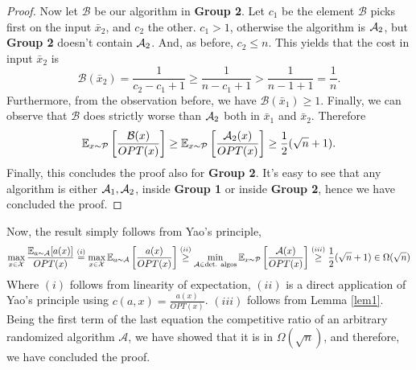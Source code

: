 \documentclass[11pt]{article}
\begin{document}
\begin{enumerate}
\begin{proof}
    Now let $\mathcal {B}$ be our algorithm in \textbf{Group 2}. Let $c_1$ be the element $\mathcal {B}$ picks first on the input $\bar x_2$, and $c_2$ the other. $c_1>1$, otherwise the algorithm is $\mathcal{A}_2$, but \textbf{Group 2} doesn't contain $\mathcal{A}_2$. And, as before, $c_2\leq n$. This yields that the cost in input $\bar x_2$ is 
    \begin{equation*}
        \mathcal {B}(\bar x_2) = \frac{1}{c_2 - c_1 + 1} \geq  \frac{1}{n - c_1 + 1} > \frac{1}{n-1+1} = \frac{1}{n}.
    \end{equation*}
    Furthermore, from the observation before, we have $\mathcal{B}(\bar x_1) \geq 1$. Finally, we can observe that $\mathcal{B}$ does strictly worse than $\mathcal{A}_2$ both in $\bar x_1$ and $\bar x_2$. Therefore
    \begin{equation*}
        \mathbb{E} _{x\sim \mathcal{P}}\left[\frac{\mathcal{B}(x)}{OPT(x)}\right] \geq \mathbb{E} _{x\sim \mathcal{P}}\left[\frac{\mathcal{A}_2(x)}{OPT(x)}\right] \geq \frac{1}{2}(\sqrt{n} + 1).
    \end{equation*}
    Finally, this concludes the proof also for \textbf{Group 2}. It's easy to see that any algorithm is either $\mathcal{A}_1,\mathcal{A}_2$, inside \textbf{Group 1} or inside \textbf{Group 2}, hence we have concluded the proof.
    \end{proof}
    Now, the result simply follows from Yao's principle,
    \begin{equation*}
        \max_{x \in \mathcal{X}} \frac{\mathbb{E}_{a\sim \mathcal{A}}[a(x)]}{OPT(x)} \stackrel{(i)}{=} \max_{x \in \mathcal{X}} \mathbb{E}_{a\sim \mathcal{A}} \left[\frac{a(x)}{OPT(x)}\right] \stackrel{(ii)}{\geq} \min_{\mathcal{A} \in \text{det. algos}}\mathbb{E}_{x \sim \mathcal{P}}\left[\frac{\mathcal{A}(x)}{OPT(x)}\right] \stackrel{(iii)}{\geq} \frac{1}{2}(\sqrt{n} + 1) \in \Omega(\sqrt{n})
    \end{equation*}
    Where $(i)$ follows from linearity of expectation, $(ii)$ is a direct application of Yao's principle using $c(a,x) =\frac{a(x)}{OPT(x)}$. $(iii)$ follows from Lemma \ref{lem1}. 
    Being the first term of the last equation the competitive ratio of an arbitrary randomized algorithm $\mathcal A$, we have showed that it is in $\Omega\left(\sqrt{n}\right)$, and therefore, we have concluded the proof.
\end{enumerate}
\end{document}
